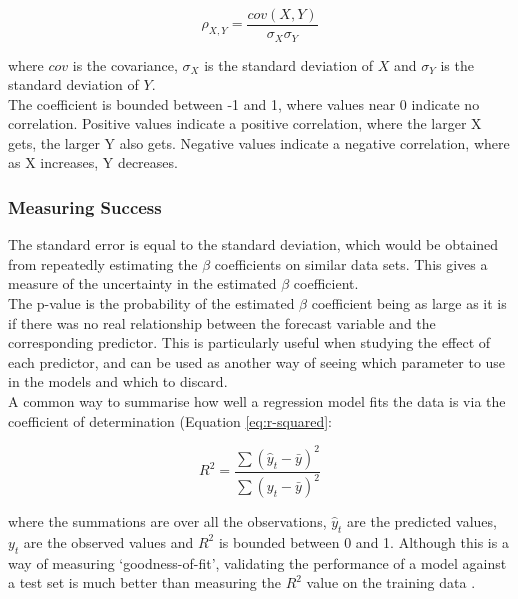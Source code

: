 \begin{equation}
\label{eq:correlation-coeff}
    \rho_{X,Y} = \frac{cov(X,Y)}{\sigma_X\sigma_Y}
\end{equation}

where $cov$ is the covariance, $\sigma_X$ is the standard deviation of $X$ and $\sigma_Y$ is the standard deviation of $Y$. \\

The coefficient is bounded between -1 and 1, where values near 0 indicate no correlation. Positive values indicate a positive correlation, where the larger X gets, the larger Y also gets. Negative values indicate a negative correlation, where as X increases, Y decreases.

\subsubsection{Measuring Success}

The standard error is equal to the standard deviation, which would be obtained from repeatedly estimating the $\beta$ coefficients on similar data sets. This gives a measure of the uncertainty in the estimated $\beta$ coefficient. \\

The p-value is the probability of the estimated $\beta$ coefficient being as large as it is if there was no real relationship between the forecast variable and the corresponding predictor. This is particularly useful when studying the effect of each predictor, and can be used as another way of seeing which parameter to use in the models and which to discard. \\ 

A common way to summarise how well a regression model fits the data is via the coefficient of determination (Equation \ref{eq:r-squared}:

\begin{equation}
    R^2 = \frac{\sum(\hat y_t - \bar y)^2}{\sum(y_t - \bar y)^2}
    \label{eq:r-squared}
\end{equation}

where the summations are over all the observations, $\hat y_t$ are the predicted values, $y_t$ are the observed values and $R^2$ is bounded between 0 and 1. Although this is a way of measuring `goodness-of-fit', validating the performance of a model against a test set is much better than measuring the $R^2$ value on the training data \cite{forecasting-book}. \\

